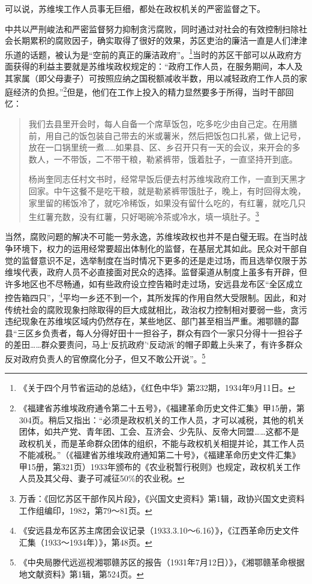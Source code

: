 可以说，苏维埃工作人员事无巨细，都处在政权机关的严密监督之下。


中共以严刑峻法和严密监督努力抑制贪污腐败，同时通过对社会的有效控制扫除社会长期累积的腐败因子，确实取得了很好的效果，苏区吏治的廉洁一直是人们津津乐道的话题，被认为是“空前的真正的廉洁政府”。\footnote{《关于四个月节省运动的总结》，《红色中华》第232期，1934年9月11日。}当时的苏区干部可以从政府方面获得的利益主要就是苏维埃政权规定的：“政府工作人员，在服务期间，本人及其家属（即父母妻子）可按照应纳之国税额减收半数，用以减轻政府工作人员的家庭经济的负担。”\footnote{《福建省苏维埃政府通令第二十五号》，《福建革命历史文件汇集》甲15册，第304页。稍后又指出：“必须是政权机关的工作人员，才可以减税，其他的机关团体，如共产党、青年团、工会、互济会、少先队、反帝大同盟……这都不是政权机关，而是革命群众团体的组织，不能与政权机关相提并论，其工作人员不能减税。”（《福建省苏维埃政府通知第二十号》，《福建革命历史文件汇集》甲15册，第321页）1933年颁布的《农业税暂行税则》也规定，政权机关工作人员及其父母、妻子可减征50\%的农业税。}但是，他们在工作上投入的精力显然要多于所得，当时干部回忆：

\begin{quote}

我们去县里开会时，每人自备一个席草饭包，吃多吃少由自己定。在用膳前，用自己的饭包装自己带去的米或薯米，然后把饭包口扎紧，做上记号，放在一口锅里统一煮……如果县、区、乡召开只有一天的会议，来开会的多数人，一不带饭，二不带干粮，勒紧裤带，饿着肚子，一直坚持开到底。

杨尚奎同志任村文书时，经常早饭后便去村苏维埃政府工作，一直到天黑才回家。中午这餐不是吃干粮，就是勒紧裤带饿肚子，晚上，有时回得太晚，家里留的稀饭冷了，就吃冷稀饭，如果没有留什么吃的，有红薯，就吃几只生红薯充数，没有红薯，只好喝碗冷茶或冷水，填一填肚子。\footnote{万香：《回忆苏区干部作风片段》，《兴国文史资料》第1辑，政协兴国文史资料工作组编印，1982，第79～81页。}
\end{quote}


当然，腐败问题的解决不可能一劳永逸，苏维埃政权也并不是白璧无瑕。在当时战争环境下，权力的运用经常要超出体制化的监督，在基层尤其如此。民众对干部自觉的监督意识不足，选举制度在当时情况下更多的还是走过场，而且选举仅限于苏维埃代表，政府人员不必直接面对民众的选择。监督渠道从制度上虽多有开辟，但许多地区也不尽畅通，如有些政府设立控告箱时走过场，安远县龙布区“全区成立控告箱四只”，\footnote{《安远县龙布区苏主席团会议记录（1933.3.10～6.16）》，《江西革命历史文件汇集（1933～1934年）》，第48页。}平均一乡还不到一个，其所发挥的作用自然大受限制。因此，和对传统社会的腐败现象扫除取得的巨大成就相比，政治权力控制相对要弱一些，贪污违纪现象在苏维埃区域内仍然存在，某些地区、部门甚至相当严重。湘鄂赣的酃县“三区乡负责者，每人分得好田十一担谷子，群众有四个一家只分得十一担谷子的差田……群众要责问，马上‘反抗政府’‘反动派’的帽子即戴上头来了，有许多群众反对政府负责人的官僚腐化分子，但又不敢公开说”。\footnote{《中央局滕代远巡视湘鄂赣苏区的报告（1931年7月12日）》，《湘鄂赣革命根据地文献资料》第1辑，第524页。}


